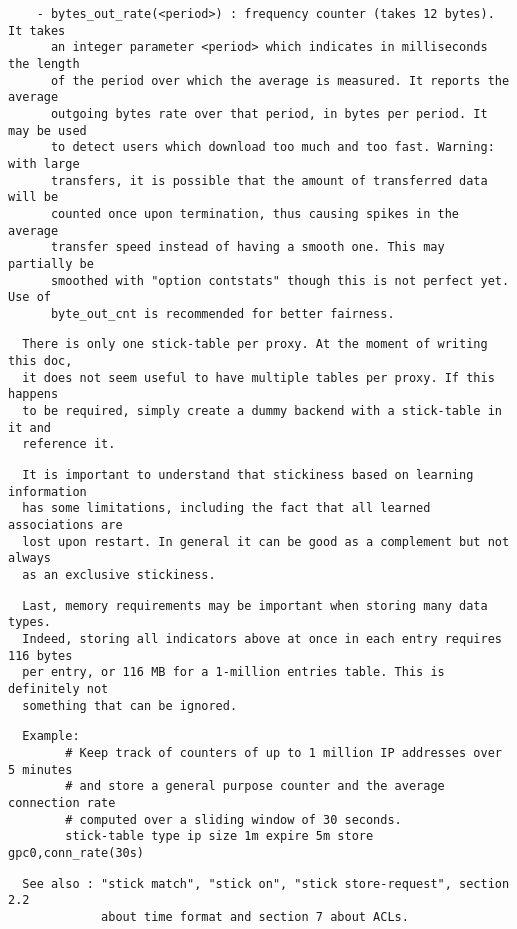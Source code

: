 \begin{verbatim}
    - bytes_out_rate(<period>) : frequency counter (takes 12 bytes). It takes
      an integer parameter <period> which indicates in milliseconds the length
      of the period over which the average is measured. It reports the average
      outgoing bytes rate over that period, in bytes per period. It may be used
      to detect users which download too much and too fast. Warning: with large
      transfers, it is possible that the amount of transferred data will be
      counted once upon termination, thus causing spikes in the average
      transfer speed instead of having a smooth one. This may partially be
      smoothed with "option contstats" though this is not perfect yet. Use of
      byte_out_cnt is recommended for better fairness.
\end{verbatim}

\begin{verbatim}
  There is only one stick-table per proxy. At the moment of writing this doc,
  it does not seem useful to have multiple tables per proxy. If this happens
  to be required, simply create a dummy backend with a stick-table in it and
  reference it.
\end{verbatim}

\begin{verbatim}
  It is important to understand that stickiness based on learning information
  has some limitations, including the fact that all learned associations are
  lost upon restart. In general it can be good as a complement but not always
  as an exclusive stickiness.
\end{verbatim}

\begin{verbatim}
  Last, memory requirements may be important when storing many data types.
  Indeed, storing all indicators above at once in each entry requires 116 bytes
  per entry, or 116 MB for a 1-million entries table. This is definitely not
  something that can be ignored.
\end{verbatim}

\begin{verbatim}
  Example:
        # Keep track of counters of up to 1 million IP addresses over 5 minutes
        # and store a general purpose counter and the average connection rate
        # computed over a sliding window of 30 seconds.
        stick-table type ip size 1m expire 5m store gpc0,conn_rate(30s)
\end{verbatim}

\begin{verbatim}
  See also : "stick match", "stick on", "stick store-request", section 2.2
             about time format and section 7 about ACLs.
\end{verbatim}

